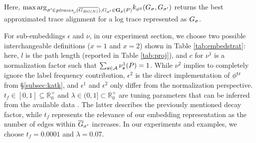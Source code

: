 %
Here, ${\max\arg}_{\nonlogtrace\in \WCal{\pmin}{n}, G_\nonlogtrace\in\TBf{p}{n}(P)} k_{\gorgembed}(G_\logtrace, G_{\nonlogtrace})$ returns the best approximated trace alignment for a log trace represented as $G_{\logtrace}$. %
%
\begin{table}[!t]
	\caption{Different sub-embeddings ($\epsilon^1$, $\epsilon^2$, $\nu^1$, and $\nu^2$) for $\gorgembed$.}\label{tab:embedstrat}
	\centering
\end{table}
%
For sub-embeddings $\epsilon$ and $\nu$, {in our experiment section}, we choose two possible interchangeable definitions ($x=1$ and $x=2$) shown in Table \ref{tab:embedstrat}: here, $l$ is the path length (reported in Table \ref{tab:proj}), and $c$ for $\nu^1$ is a normalization factor such that $\sum_{\const{a}\in\tasks}\nu^1_\const{a}(P)=1$. While $\nu^2$ implies to completely ignore the label frequency contribution, $\epsilon^2$ is the direct implementation of $\trembed$ from \S\ref{subsec:katk}, and $\epsilon^1$ and $\epsilon^2$ only differ from the normalization perspective. $t_f\in [0,1]\subseteq\mathbb{R}^+_{0}$ and $\lambda\in (0,1]\subset\mathbb{R}^+_{0}$ are tuning parameters that can be
inferred from the available data \cite{DriessensRG06}. The latter describes the previously mentioned decay factor, while $t_f$
represents the relevance of our embedding representation as the number of edges within $\closed{G}_\nonlogtrace$ increases. In our experiments and
examples, we choose $t_f=0.0001$ and $\lambda=0.07$.





